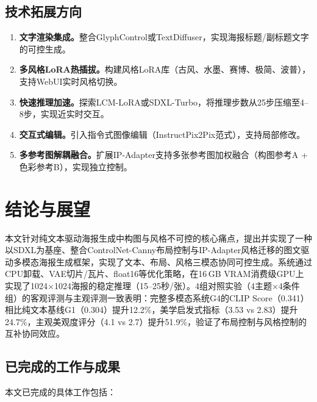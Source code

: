 \documentclass[12pt,a4paper]{ctexart}
\begin{document}
\subsection{技术拓展方向}

\begin{enumerate}[itemsep=2pt,topsep=4pt]
    \item \textbf{文字渲染集成。}整合GlyphControl或TextDiffuser，实现海报标题/副标题文字的可控生成。
    \item \textbf{多风格LoRA热插拔。}构建风格LoRA库（古风、水墨、赛博、极简、波普），支持WebUI实时风格切换。
    \item \textbf{快速推理加速。}探索LCM-LoRA或SDXL-Turbo，将推理步数从25步压缩至4--8步，实现近实时交互。
    \item \textbf{交互式编辑。}引入指令式图像编辑（InstructPix2Pix范式），支持局部修改。
    \item \textbf{多参考图解耦融合。}扩展IP-Adapter支持多张参考图加权融合（构图参考A + 色彩参考B），实现独立控制。
\end{enumerate}

\section{结论与展望}
\label{sec:conclusion}

本文针对纯文本驱动海报生成中构图与风格不可控的核心痛点，提出并实现了一种以SDXL为基座、整合ControlNet-Canny布局控制与IP-Adapter风格迁移的图文驱动多模态海报生成框架，实现了文本、布局、风格三模态协同可控生成。系统通过CPU卸载、VAE切片/瓦片、float16等优化策略，在16\,GB VRAM消费级GPU上实现了1024$\times$1024海报的稳定推理（15--25秒/张）。4组对照实验（4主题$\times$4条件组）的客观评测与主观评测一致表明：完整多模态系统G4的CLIP Score（0.341）相比纯文本基线G1（0.304）提升12.2\%，美学启发式指标（3.53 vs 2.83）提升24.7\%，主观美观度评分（4.1 vs 2.7）提升51.9\%，验证了布局控制与风格控制的互补协同效应。

\subsection*{已完成的工作与成果}

本文已完成的具体工作包括：
\end{document}
